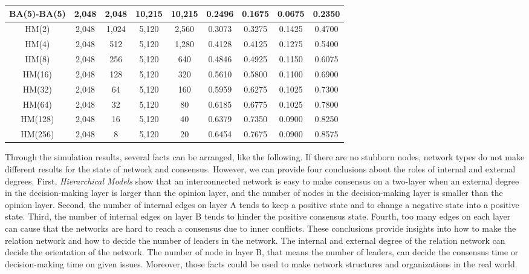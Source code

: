 \begin{table}[!htb]
\begin{center}
\begin{tabular}{c|c|c|c|c|c|c|c|c}
			BA(5)-BA(5)            & 2,048 	& 2,048   & 10,215  & 10,215  &  0.2496   & 0.1675 & 0.0675 & 0.2350   \\ \hline
			HM(2)  				   & 2,048 	& 1,024   & 5,120   & 2,560   &  0.3073   & 0.3275 & 0.1425 & 0.4700   \\ \hline    
			HM(4) 				   & 2,048 	&  512    & 5,120   & 1,280   &  0.4128   & 0.4125 & 0.1275 & 0.5400   \\ \hline
			HM(8)  				   & 2,048 	&  256    & 5,120   & 640     &  0.4846   & 0.4925 & 0.1150 & 0.6075   \\ \hline
			HM(16)				   & 2,048 	&  128    & 5,120   & 320     &  0.5610   & 0.5800 & 0.1100 & 0.6900   \\ \hline
			HM(32) 				   & 2,048 	&   64    & 5,120   & 160     &  0.5959   & 0.6275 & 0.1025 & 0.7300   \\ \hline
			HM(64) 				   & 2,048 	&   32    & 5,120   & 80      &  0.6185   & 0.6775 & 0.1025 & 0.7800   \\ \hline 
			HM(128) 			   & 2,048 	&   16    & 5,120   & 40      &  0.6379   & 0.7350 & 0.0900 & 0.8250   \\ \hline 
			HM(256) 			   & 2,048 	&    8    & 5,120   & 20      &  0.6454   & 0.7675 & 0.0900 & 0.8575   \\ \hline 
			 \hline
		\end{tabular}
	\end{center}
\end{table} 

Through the simulation results, several facts can be arranged, like the following. If there are no stubborn nodes, network types do not make different results for the state of network and consensus. However, we can provide four conclusions about the roles of internal and external degrees. First, \textit{Hierarchical Models} show that an interconnected network is easy to make consensus on a two-layer when an external degree in the decision-making layer is larger than the opinion layer, and the number of nodes in the decision-making layer is smaller than the opinion layer. Second, the number of internal edges on layer A tends to keep a positive state and to change a negative state into a positive state. Third, the number of internal edges on layer B tends to hinder the positive consensus state. Fourth, too many edges on each layer can cause that the networks are hard to reach a consensus due to inner conflicts. These conclusions provide insights into how to make the relation network and how to decide the number of leaders in the network. The internal and external degree of the relation network can decide the orientation of the network. The number of node in layer B, that means the number of leaders, can decide the consensus time or decision-making time on given issues. Moreover, those facts could be used to make network structures and organizations in the real world. \\
